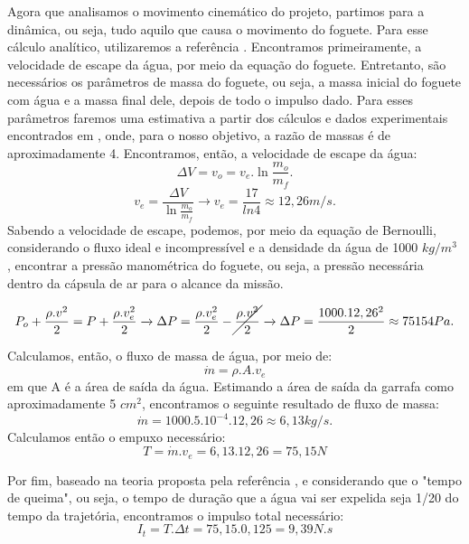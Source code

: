 Agora que analisamos o movimento cinemático do projeto, partimos para a dinâmica, ou seja, tudo aquilo que causa o movimento do foguete. Para esse cálculo analítico, utilizaremos a referência \cite{rocketpropulsionelements}.
Encontramos primeiramente, a velocidade de escape da água, por meio da equação do foguete. Entretanto, são necessários os parâmetros de massa do foguete, ou seja, a massa inicial do foguete com água e a massa final dele, depois de todo o impulso dado. Para esses parâmetros faremos uma estimativa a partir dos cálculos e dados experimentais encontrados em \cite{tcc}, onde, para o nosso objetivo, a razão de massas é de aproximadamente 4. Encontramos, então, a velocidade de escape da água:
\begin{equation}
    \Delta V=v_o= v_e.\ln{\frac{m_o}{m_f}}.
    \label{ve}
\end{equation}
\begin{equation}
    v_e=\frac{\Delta V}{\ln{\frac{m_o}{m_f}}} \xrightarrow{} v_e=\frac{17}{ln{4}} \approx 12,26 m/s.
\end{equation}
Sabendo a velocidade de escape, podemos, por meio da equação de Bernoulli, considerando o fluxo ideal e incompressível e a densidade da água de 1000 \(kg/m^3\) , encontrar a pressão manométrica do foguete, ou seja, a pressão necessária dentro da cápsula de ar para o alcance da missão.

\begin{equation}
    P_o+\frac{\rho. v^2}{2}=P+\frac{\rho . v_e^2}{2} \xrightarrow{} \Delta P=\frac{\rho.v_e^2}{2} - \cancel{\frac{\rho.v^2}{2}} \xrightarrow{} \Delta P=\frac{1000.12,26^2}{2} \approx 75154 Pa.
    \label{delta P}
\end{equation}

Calculamos, então, o fluxo de massa de água, por meio de:
\begin{equation}
    \dot{m}=\rho.A.v_e
    \label{mponto}
\end{equation}
em que A é a área de saída da água. Estimando a área de saída da garrafa como aproximadamente 5 \(cm^2\), encontramos o seguinte resultado de fluxo de massa:
\begin{equation}
    \dot{m}=1000.5.10^{-4}.12,26 \approx 6,13kg/s.
\end{equation}
Calculamos então o empuxo necessário:
\begin{equation}
    T=\dot{m}.v_e=6,13.12,26=75,15N
    \label{empuxo}
\end{equation}

Por fim, baseado na teoria proposta pela referência \cite{rocketpropulsionelements}, e considerando que o "tempo de queima", ou seja, o tempo de duração que a água vai ser expelida seja 1/20 do tempo da trajetória, encontramos o impulso total necessário:
\begin{equation}
    I_t=T.\Delta t =75,15.0,125=9,39N.s
    \label{impulso total}
\end{equation}

